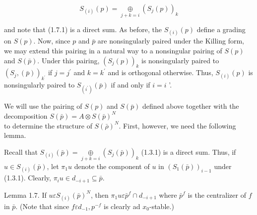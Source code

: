 \documentclass[10pt]{article}
\begin{document}
$$
S_{(i)}(p)=\underset{j+k=i}{\oplus}\left(S_{j}(p)\right)_{k}
$$

and note that (1.7.1) is a direct sum. As before, the $S_{(i)}(p)$ define a grading on $S(p)$. Now, since $p$ and $\bar{p}$ are nonsingularly paired under the Killing form, we may extend this pairing in a natural way to a nonsingular pairing of $S(p)$ and $S(\bar{p})$. Under this pairing, $\left(S_{j}(p)\right)_{k}$ is nonsingularly paired to $\left(S_{j},(\bar{p})\right)_{k^{\prime}}$ if $j=j^{\prime}$ and $k=k^{\prime}$ and is orthogonal otherwise. Thus, $S_{(i)}(p)$ is nonsingularly paired to $S_{\left(i^{\prime}\right)}(\bar{p})$ if and only if $i=i$ '.

We will use the pairing of $S(p)$ and $S(\bar{p})$ defined above together with the decomposition $S(\bar{p})=A \otimes S(\bar{p})^{N}$\\
to determine the structure of $S(\bar{\rho})^{N}$. First, however, we need the following lemma.

Recall that $S_{(i)}(\bar{p})=\underset{j+k=i}{\oplus}\left(S_{j}(\bar{p})\right)_{k}$ (1.3.1) is a direct sum. Thus, if $u \in S_{(i)}(\bar{p})$, let $\pi_{1} u$ denote the component of $u$ in $\left(S_{1}(\bar{p})\right)_{i-1}$ under (1.3.1). Clearly, $\pi_{i} u \in d_{-i+1} \subseteq \bar{p}$.

Lemma 1.7. If $u \varepsilon S_{(i)}(\bar{p})^{N}$, then $\pi_{1} u \varepsilon \bar{p}^{f} \cap d_{-i+1}$ where $\bar{p}^{f}$ is the centralizer of $f$ in $\bar{p}$. (Note that since $f \varepsilon d_{-1}, p^{-f}$ is clearly ad $x_{0}$-stable.)
\end{document}
